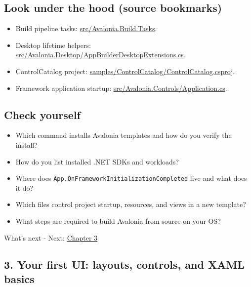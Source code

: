 \subsection{Look under the hood (source
bookmarks)}\label{look-under-the-hood-source-bookmarks}

\begin{itemize}
\tightlist
\item
  Build pipeline tasks:
  \href{https://github.com/AvaloniaUI/Avalonia/tree/master/src/Avalonia.Build.Tasks}{src/Avalonia.Build.Tasks}.
\item
  Desktop lifetime helpers:
  \href{https://github.com/AvaloniaUI/Avalonia/blob/master/src/Avalonia.Desktop/AppBuilderDesktopExtensions.cs}{src/Avalonia.Desktop/AppBuilderDesktopExtensions.cs}.
\item
  ControlCatalog project:
  \href{https://github.com/AvaloniaUI/Avalonia/blob/master/samples/ControlCatalog/ControlCatalog.csproj}{samples/ControlCatalog/ControlCatalog.csproj}.
\item
  Framework application startup:
  \href{https://github.com/AvaloniaUI/Avalonia/blob/master/src/Avalonia.Controls/Application.cs}{src/Avalonia.Controls/Application.cs}.
\end{itemize}

\subsection{Check yourself}\label{check-yourself}

\begin{itemize}
\tightlist
\item
  Which command installs Avalonia templates and how do you verify the
  install?
\item
  How do you list installed .NET SDKs and workloads?
\item
  Where does
  \passthrough{\lstinline!App.OnFrameworkInitializationCompleted!} live
  and what does it do?
\item
  Which files control project startup, resources, and views in a new
  template?
\item
  What steps are required to build Avalonia from source on your OS?
\end{itemize}

What's next - Next: \href{Chapter03.md}{Chapter 3}

\newpage

\subsection{3. Your first UI: layouts, controls, and XAML
basics}\label{your-first-ui-layouts-controls-and-xaml-basics}

